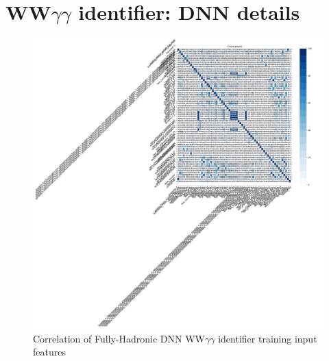 \clearpage
\section{\texorpdfstring{WW$\gamma\gamma$}{WWyy} identifier: DNN details}

\begin{figure}[!htbp]
    \includegraphics[width=\textwidth,trim={17cm 17cm 0 0},clip=true]{Sections/HHWWgg/images/FH_DNN/EFT/HHWWyyDNN_binary_scan_BalanceYields/correlation_plot.png}
    \caption{Correlation of Fully-Hadronic DNN WW$\gamma \gamma$ identifier training input features}
    \label{fig:FH_DNN_CorrelationPlot_appendix}
\end{figure}


